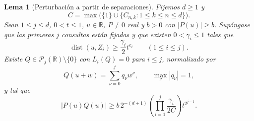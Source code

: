 \documentclass[11pt,a4paper]{article}
\numberwithin{equation}{section}
\newtheorem{lemma}[theorem]{Lema}
\theoremstyle{definition}
\theoremstyle{remark}
\newcommand{\R}{\mathbb R}
\newcommand{\PP}{\mathcal P}
\DeclareMathOperator{\dist}{dist}
\begin{document}
\begin{lemma}[Perturbación a partir de separaciones]\label{lem:perturb}
Fijemos $d\ge1$ y
\[
C=\max\bigl(\{1\}\cup\{C_{n,k}:1\le k\le n\le d\}\bigr).
\]
Sean $1\le j\le d$, $0<t\le1$, $u\in\R$, $P\ne0$ real y $b>0$ con $|P(u)|\ge b$. Supóngase que las primeras $j$ consultas están fijadas y que existen $0<\gamma_i\le1$ tales que
\begin{equation}\label{eq:separations}
\dist(u,Z_i)\ge\frac{\gamma_i}{2}t^{e_i}\qquad(1\le i\le j).
\end{equation}
Existe $Q\in\PP_j(\R)\setminus\{0\}$ con $L_i(Q)=0$ para $i\le j$, normalizado por
\[
Q(u+w)=\sum_{\nu=0}^jq_\nu w^\nu,\qquad\max_\nu|q_\nu|=1,
\]
y tal que
\begin{equation}\label{eq:perturb}
|P(u)Q(u)|\ge
b\,2^{-(d+1)}\left(\prod_{i=1}^j\frac{\gamma_i}{2C}\right)t^{2^{j-1}}.
\end{equation}
\end{lemma}
\end{document}
